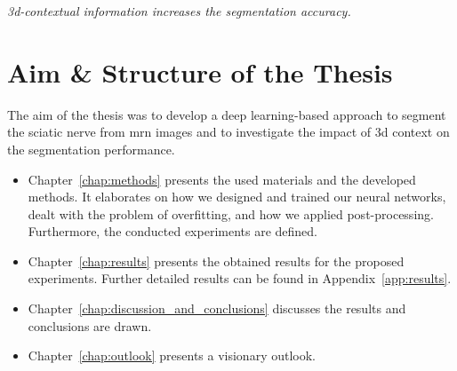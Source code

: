 \textit{\gls{3d}-contextual information increases the segmentation accuracy.}

\section{Aim \& Structure of the Thesis} %
The aim of the thesis was to develop a deep learning-based approach to segment the sciatic nerve from \gls{mrn} images and to investigate the impact of \gls{3d} context on the segmentation performance.\\
\begin{itemize}
    \item Chapter~\ref{chap:methods} presents the used materials and the developed methods. It elaborates on how we designed and trained our neural networks, dealt with the problem of overfitting, and how we applied post-processing. Furthermore, the conducted experiments are defined.
    \item Chapter~\ref{chap:results} presents the obtained results for the proposed experiments. Further detailed results can be found in Appendix~\ref{app:results}.
    \item Chapter~\ref{chap:discussion_and_conclusions} discusses the results and conclusions are drawn.
    \item Chapter~\ref{chap:outlook} presents a visionary outlook.
\end{itemize}

\endinput